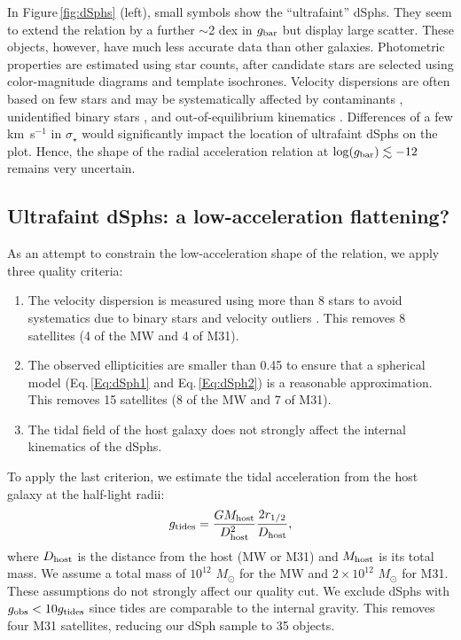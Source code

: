 \documentclass[apjl, twocolappendix]{emulateapj}
\begin{document}
In Figure\,\ref{fig:dSphs} (left), small symbols show the ``ultrafaint'' dSphs. They seem to extend the relation by a further $\sim$2 dex in $g_{\rm bar}$ but display large scatter. These objects, however, have much less accurate data than other galaxies. Photometric properties are estimated using star counts, after candidate stars are selected using color-magnitude diagrams and template isochrones. Velocity dispersions are often based on few stars and may be systematically affected by contaminants \citep{Walker2009b}, unidentified binary stars \citep{McConnachie2010}, and out-of-equilibrium kinematics \citep{McGaugh2010}. Differences of a few km~s$^{-1}$ in $\sigma_{\star}$ would significantly impact the location of ultrafaint dSphs on the plot. Hence, the shape of the radial acceleration relation at $\log(g_{\rm bar}) \lesssim -12$ remains very uncertain.

\subsection{Ultrafaint dSphs: a low-acceleration flattening?}\label{sec:ultrafaint}

As an attempt to constrain the low-acceleration shape of the relation, we apply three quality criteria:
\begin{enumerate}
 \item The velocity dispersion is measured using more than 8 stars to avoid systematics due to binary stars and velocity outliers \citep[see Appendix A.3 of][]{2013ApJ...768..172C}. This removes 8 satellites (4 of the MW and 4 of M31).
 \item The observed ellipticities are smaller than 0.45 to ensure that a spherical model (Eq.\,\ref{Eq:dSph1} and Eq.\,\ref{Eq:dSph2}) is a reasonable approximation. This removes 15 satellites (8 of the MW and 7 of M31).
 \item The tidal field of the host galaxy does not strongly affect the internal kinematics of the dSphs.
\end{enumerate}
To apply the last criterion, we estimate the tidal acceleration from the host galaxy at the half-light radii:
\begin{equation}\label{Eq:Tidal}
 g_{\rm tides} = \dfrac{G M_{\rm host}}{D_{\rm host}^{2}}\dfrac{2 r_{1/2}}{D_{\rm host}},
\end{equation}
where $D_{\rm host}$ is the distance from the host (MW or M31) and $M_{\rm host}$ is its total mass. We assume a total mass of $10^{12}$ $M_{\odot}$ for the MW and $2 \times 10^{12}$ $M_{\odot}$ for M31. These assumptions do not strongly affect our quality cut. We exclude dSphs with $g_{\rm obs}<10g_{\rm tides}$ since tides are comparable to the internal gravity. This removes four M31 satellites, reducing our dSph sample to 35 objects.
\end{document}

